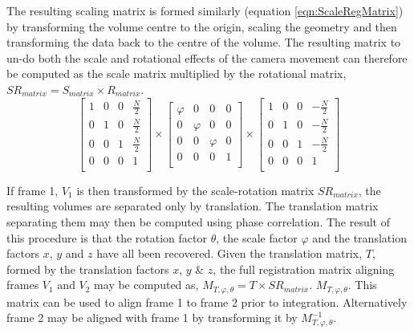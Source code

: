 The resulting scaling matrix is formed similarly (equation \ref{eqn:ScaleRegMatrix}) by transforming the volume centre to the origin, scaling the geometry and then transforming the data back to the centre of the volume. The resulting matrix to un-do both the scale and rotational effects of the camera movement can therefore be computed as the scale matrix multiplied by the rotational matrix, $SR_{matrix} = S_{matrix} \times R_{matrix}$. \\

\begin{equation} \label{eqn:ScaleRegMatrix}
\left[
\begin{array}{cccc}
1 & 0 & 0 & \frac{N}{2} \\
0 & 1 & 0 & \frac{N}{2} \\
0 & 0 & 1 & \frac{N}{2} \\
0 & 0 & 0 & 1 \\
\end{array}
\right] \times
\left[
\begin{array}{cccc}
\varphi & 0 & 0 & 0 \\
0 & \varphi & 0 & 0 \\
0 & 0 & \varphi & 0 \\
0 & 0 & 0 & 1 \\
\end{array}
\right] \times
\left[
\begin{array}{cccc}
1 & 0 & 0 & -\frac{N}{2} \\
0 & 1 & 0 & -\frac{N}{2} \\
0 & 0 & 1 & -\frac{N}{2} \\
0 & 0 & 0 & 1 \\
\end{array}
\right]
\end{equation}

If frame 1, $V_1$ is then transformed by the scale-rotation matrix $SR_{matrix}$, the resulting volumes are separated only by translation. The translation matrix separating them may then be computed using phase correlation. The result of this procedure is that the rotation factor $\theta$, the scale factor $\varphi$ and the translation factors $x$, $y$ and $z$ have all been recovered. Given the translation matrix, $T$, formed by the translation factors $x$, $y$ \& $z$, the full registration matrix aligning frames $V_1$ and $V_2$ may be computed as, $M_{T,\varphi,\theta} = T \times SR_{matrix}$. $M_{T,\varphi,\theta}$. This matrix can be used to align frame 1 to frame 2 prior to integration. Alternatively frame 2 may be aligned with frame 1 by transforming it by $M_{T,\varphi,\theta}^{-1}$. \\

